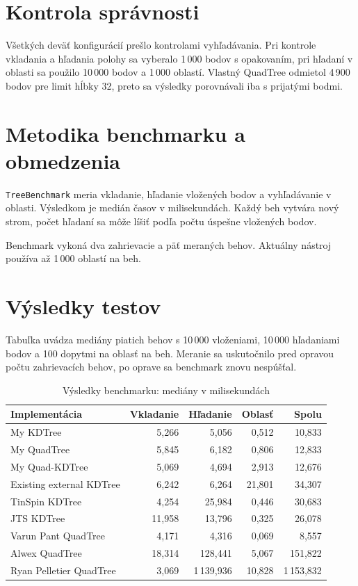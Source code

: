 \documentclass[12pt,a4paper,oneside]{report}
\begin{document}
\section{Kontrola správnosti}
Všetkých deväť konfigurácií prešlo kontrolami vyhľadávania.
Pri kontrole vkladania a hľadania polohy sa vyberalo
1\,000 bodov s opakovaním, pri hľadaní v oblasti sa použilo 10\,000
bodov a 1\,000 oblastí. Vlastný QuadTree odmietol 4\,900 bodov pre limit
hĺbky 32, preto sa výsledky porovnávali iba s prijatými bodmi.

\section{Metodika benchmarku a obmedzenia}
\texttt{TreeBenchmark} meria vkladanie, hľadanie vložených bodov
a vyhľadávanie v oblasti. Výsledkom je medián časov v milisekundách.
Každý beh vytvára nový strom, počet hľadaní sa môže líšiť podľa počtu
úspešne vložených bodov.

Benchmark vykoná dva zahrievacie a päť meraných behov. Aktuálny nástroj
používa až 1\,000 oblastí na beh.

\section{Výsledky testov}
Tabuľka uvádza mediány piatich behov s 10\,000 vloženiami,
10\,000 hľadaniami bodov a 100 dopytmi na oblasť na beh. Meranie sa
uskutočnilo pred opravou počtu zahrievacích behov, po oprave sa benchmark
znovu nespúšťal.

\begin{table}[H]
\centering
\small
\begin{tabularx}{\textwidth}{@{}Xrrrr@{}}
\toprule
\textbf{Implementácia} & \textbf{Vkladanie} & \textbf{Hľadanie} &
\textbf{Oblasť} & \textbf{Spolu}\\
\midrule
My KDTree & 5,266 & 5,056 & 0,512 & 10,833\\
My QuadTree & 5,845 & 6,182 & 0,806 & 12,833\\
My Quad-KDTree & 5,069 & 4,694 & 2,913 & 12,676\\
Existing external KDTree & 6,242 & 6,264 & 21,801 & 34,307\\
TinSpin KDTree & 4,254 & 25,984 & 0,446 & 30,683\\
JTS KDTree & 11,958 & 13,796 & 0,325 & 26,078\\
Varun Pant QuadTree & 4,171 & 4,316 & 0,069 & 8,557\\
Alwex QuadTree & 18,314 & 128,441 & 5,067 & 151,822\\
Ryan Pelletier QuadTree & 3,069 & 1\,139,936 & 10,828 & 1\,153,832\\
\bottomrule
\end{tabularx}
\caption{Výsledky benchmarku: mediány v milisekundách}
\label{tab:historical-results}
\end{table}
\end{document}
